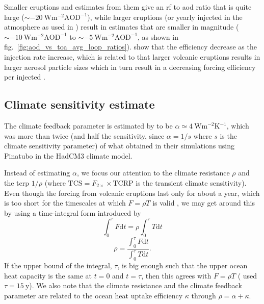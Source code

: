 \documentclass{ametsocV6.1}
\newcommand{\iso}[1][i]{{#1}njected \ce{SO2}}
\begin{document}
Smaller eruptions and estimates from them give an \gls{rf} to \gls{aod} ratio that is
quite large (\(\sim \SI{-20}{\watt\metre^{-2}\mathrm{AOD}^{-1}}\)), while larger
eruptions (or yearly \iso{} in the atmosphere as used in \citet{niemeier2015}) result in
estimates that are smaller in magnitude (\(\sim
\SI{-10}{\watt\metre^{-2}\mathrm{AOD}^{-1}}\) to \(\sim
\SI{-5}{\watt\metre^{-2}\mathrm{AOD}^{-1}}\), as shown in
fig.~\ref{fig:aod_vs_toa_avg_loop_ratios}). \citet{niemeier2017} show that the
efficiency decrease as the injection rate increase, which is related to that larger
volcanic eruptions results in larger aerosol particle sizes which in turn result in a
decreasing forcing efficiency per \iso{} \citep{english2013, timmreck2018}.

\subsection{Climate sensitivity estimate}


The climate feedback parameter is estimated by \citet{jones2005} to be \(\alpha \simeq
\SI{4}{\watt\metre^{-2}\kelvin^{-1}}\), which was more than twice (and half the
sensitivity, since \(\alpha =1/s\) where \(s\) is the climate sensitivity parameter) of
what \citet{gregory2016} obtained in their simulations using Pinatubo in the HadCM3
climate model.

Instead of estimating \(\alpha \), we focus our attention to the climate resistance
\(\rho \) and the \gls{tcrp} \(1/\rho\) (where \(\mathrm{TCS}=F_{2\times}\times
\mathrm{TCRP}\) is the transient climate sensitivity). Even though the forcing from
volcanic eruptions last only for about a year, which is too short for the timescales at
which \(F=\rho T\) is valid \citep{gregory2016}, we may get around this by using a
time-integral form introduced by \citet{merlis2014}
\begin{equation}
  \int_0^{\tau}F \mathrm{d}t=\rho\int_{0}^{\tau}T \mathrm{d}t
\end{equation}
\begin{equation}
  \rho=\frac{\int_0^{\tau}F \mathrm{d}t}{\int_{0}^{\tau}T \mathrm{d}t}.
  \label{eq:climate-resistance}
\end{equation}
%
If the upper bound of the integral, \(\tau \), is big enough such that the upper ocean
heat capacity is the same at \(t=0\) and \(t=\tau \), then this agrees with \(F=\rho T\)
\citep{gregory2016} (\citet{merlis2014} used \(\tau =\SI{15}{\mathrm{y}}\)). We also
note that the climate resistance and the climate feedback parameter are related to the
ocean heat uptake efficiency \(\kappa \) through \(\rho =\alpha +\kappa \).
\end{document}
